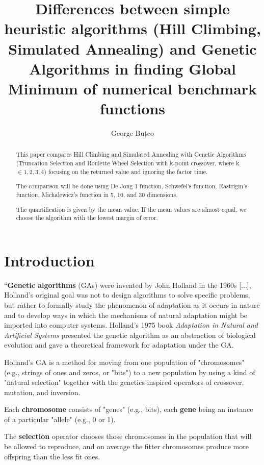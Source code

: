 \documentclass{article}
\title{Differences between simple heuristic algorithms (Hill Climbing, Simulated Annealing) and Genetic Algorithms in finding Global Minimum of numerical benchmark functions}
\author{George Buțco}
\begin{document}
\maketitle

\begin{abstract}


This paper compares Hill Climbing and Simulated Annealing with Genetic Algorithms (Truncation Selection and Roulette Wheel Selection with k-point crossover, where k $\in {1, 2, 3, 4}$) focusing on the returned value and ignoring the factor time.

The comparison will be done using De Jong 1 function\cite{deJong}, Schwefel's function\cite{jamil2013literature}, Rastrigin's function\cite{rastrigin}, Michalewicz's function\cite{back1997handbook} in 5, 10, and 30 dimensions.

The quantification is given by the mean value. If the mean values are almost equal, we choose the algorithm with the lowest margin of error.

\end{abstract}

\section{Introduction}
“\textbf{Genetic algorithms} (GAs) were invented by John Holland in the 1960s [...], Holland's original goal was not to design algorithms to solve specific problems, but rather to formally study the phenomenon of adaptation as it occurs in nature and to develop ways in which the mechanisms of natural adaptation might be imported into computer systems. Holland's 1975 book \textit{Adaptation in Natural and Artificial Systems}\cite{sampson1976adaptation} presented the genetic algorithm as an abstraction of biological evolution and gave a theoretical framework for adaptation under the GA.

Holland's GA is a method for moving from one population of "chromosomes" (e.g., strings of ones and zeros, or "bits") to a new population by using a kind of "natural selection" together with the genetics-inspired operators of crossover, mutation, and inversion.

Each \textbf{chromosome} consists of "genes" (e.g., bits), each \textbf{gene} being an instance of a particular "allele" (e.g., 0 or 1).

The \textbf{selection} operator chooses those chromosomes in the population that will be allowed to reproduce, and on average the fitter chromosomes produce more offspring than the less fit ones.
\end{document}
